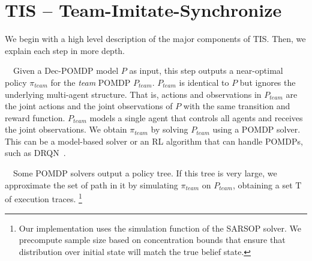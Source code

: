 \documentclass[runningheads]{llncs}
\newcommand{\Tau}{\mathrm{T}}
\begin{document}
\section{TIS -- Team-Imitate-Synchronize}

We begin with a high level description of the major components of TIS.
Then, we explain each step in more depth. 

\ \ 
Given a Dec-POMDP model $P$ as input, this step outputs a near-optimal policy $\pi_{team}$ for the {\em team} POMDP $P_{team}$. $P_{team}$ is identical to $P$ but ignores the underlying multi-agent structure. That is, actions and observations in $P_{team}$ are the joint actions and the joint observations of $P$ with the same transition and reward function. 
$P_{team}$ models a single agent that controls all agents and receives the joint observations. %
We obtain $\pi_{team}$ by solving $P_{team}$ using a POMDP solver. This can be a model-based solver or an RL algorithm that can handle POMDPs, such as DRQN~\cite{DRQN}.


\ \  Some POMDP solvers output a policy tree. If
this tree is very large, we approximate the set of path in it by simulating $\pi_{team}$ on $P_{team}$, obtaining a set $\Tau$ of execution traces.%
\footnote{Our implementation uses the simulation function of the SARSOP solver. We precompute sample size based on concentration bounds that ensure that distribution over initial state will match the true belief state.}
\end{document}
